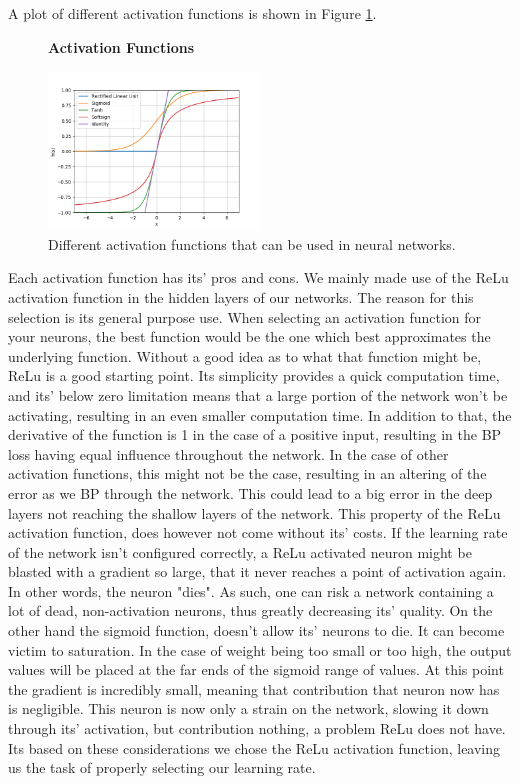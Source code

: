 A plot of different activation functions is shown in Figure
\ref{fig:activation_functions}.

\begin{figure}
    \centering
    \textbf{Activation Functions}\par\medskip
    \includegraphics[width=0.5\textwidth]{./pictures/method/activation_functions.png}
    \caption{Different activation functions that can be used in neural
        networks.}
    \label{fig:activation_functions}
\end{figure}

Each activation function has its' pros and cons. We mainly made use of the
\gls{ReLu} activation function in the hidden layers of our networks. The reason
for this selection is its general purpose use. When selecting an activation
function for your neurons, the best function would be the one which best
approximates the underlying function. Without a good idea as to what that
function might be, \gls{ReLu} is a good starting point. Its simplicity provides
a quick computation time, and its' below zero limitation means that a large
portion of the network won't be activating, resulting in an even smaller
computation time. In addition to that, the derivative of the function is 1
in the case of a positive input, resulting in the \gls{BP} loss having equal
influence throughout the network. In the case of other activation functions,
this might not be the case, resulting in an altering of the error as we \gls{BP}
through the network. This could lead to a big error in the deep layers not
reaching the shallow layers of the network. This property of the \gls{ReLu}
activation function, does however not come without its' costs. If the learning
rate of the network isn't configured correctly, a \gls{ReLu} activated neuron
might be blasted with a gradient so large, that it never reaches a point of
activation again. In other words, the neuron "dies". As such, one can risk
a network containing a lot of dead, non-activation neurons, thus greatly
decreasing its' quality. On the other hand the sigmoid function, doesn't allow
its' neurons to die. It can become victim to saturation. In the case of
weight being too small or too high, the output values will be placed
at the far ends of the sigmoid range of values. At this point the gradient
is incredibly small, meaning that contribution that neuron now has is
negligible. This neuron is now only a strain on the network, slowing
it down through its' activation, but contribution nothing, a problem
\gls{ReLu} does not have. Its based on these considerations we chose
the \gls{ReLu} activation function, leaving us the task of properly selecting
our learning rate.\cite{JiYan}\cite{AndrejKarpathy}\cite{AvinashSharmaV}

